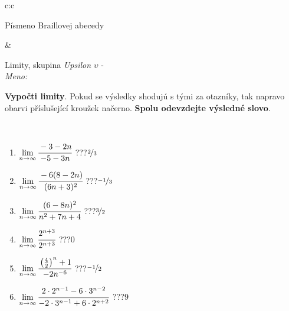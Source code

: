 \documentclass[10pt]{report}
\begin{document}
\begin{tabular}{c:c}
\begin{minipage}[c][104.5mm][t]{0.5\linewidth}
\begin{center}
\begin{minipage}{0.20\linewidth}
\begin{center}
{\small Písmeno Braillovej abecedy}
\end{center}
\end{minipage}
\end{center}
\end{minipage}
&
\begin{minipage}[c][104.5mm][t]{0.5\linewidth}
\begin{center}
\vspace{7mm}
{\huge Limity, skupina \textit{Upsilon $\upsilon$} -}\\[5mm]
\textit{Meno:}\phantom{xxxxxxxxxxxxxxxxxxxxxxxxxxxxxxxxxxxxxxxxxxxxxxxxxxxxxxxxxxxxxxxxx}\\[5mm]
\begin{minipage}{0.95\linewidth}
\begin{center}
\textbf{Vypočti limity}. Pokud se výsledky shodujú s tými za otazníky, tak napravo\\obarvi příslušející kroužek načerno. \textbf{Spolu odevzdejte výsledné slovo}.
\end{center}
\end{minipage}
\\[1mm]
\begin{minipage}{0.79\linewidth}
\begin{center}
\begin{varwidth}{\linewidth}
\begin{enumerate}
\normalsize
\item $\lim\limits_{n\to\infty}\cfrac{-3-2n}{-5-3n}$\quad \dotfill\; ???\;\dotfill \quad $\nicefrac{2}{3}$
\item $\lim\limits_{n\to\infty}\cfrac{-6(8-2n)}{(6n+3)^2}$\quad \dotfill\; ???\;\dotfill \quad $\nicefrac{-1}{3}$
\item $\lim\limits_{n\to\infty}\cfrac{(6-8n)^2}{n^2+7n+4}$\quad \dotfill\; ???\;\dotfill \quad $\nicefrac{3}{2}$
\item $\lim\limits_{n\to\infty}\cfrac{2^{n+3}}{2^{n+3}}$\quad \dotfill\; ???\;\dotfill \quad $0$
\item $\lim\limits_{n\to\infty}\cfrac{\left(\frac{4}{2}\right)^n +1}{-2n^{-6}}$\quad \dotfill\; ???\;\dotfill \quad $\nicefrac{-1}{2}$
\item $\lim\limits_{n\to\infty}\cfrac{2\cdot 2^{n-1}-6\cdot 3^{n-2}}{-2\cdot 3^{n-1}+6\cdot 2^{n+2}}$\quad \dotfill\; ???\;\dotfill \quad $9$
\end{enumerate}
\end{varwidth}
\end{center}
\end{minipage}

\end{center}
\end{minipage}
\end{tabular}
\end{document}
